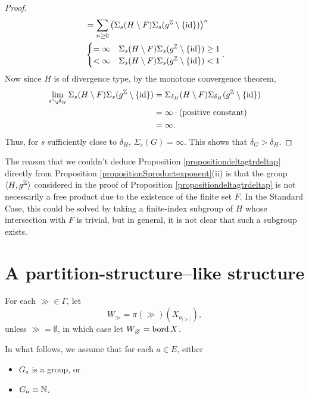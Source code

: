 \begin{proof}
\begin{align*}
&= \sum_{n\geq 0} \left(\Sigma_s(H\butnot F) \Sigma_s(g^\Z\butnot\{\id\})\right)^n\\
&\begin{cases}
= \infty & \Sigma_s(H\butnot F) \Sigma_s(g^\Z\butnot\{\id\}) \geq 1\\
< \infty & \Sigma_s(H\butnot F) \Sigma_s(g^\Z\butnot\{\id\}) < 1
\end{cases}.
\end{align*}
Now since $H$ is of divergence type, by the monotone convergence theorem,
\begin{align*}
\lim_{s\searrow\delta_H} \Sigma_s(H\butnot F) \Sigma_s(g^\Z\butnot\{\id\}) &= \Sigma_{\delta_H}(H\butnot F) \Sigma_{\delta_H}(g^\Z\butnot\{\id\})\\ 
&= \infty \cdot (\text{positive constant})\\
&= \infty.
\end{align*}
Thus, for $s$ sufficiently close to $\delta_H$, $\Sigma_s(G) = \infty$. This shows that $\delta_G > \delta_H$.
\end{proof}
\begin{remark}
The reason that we couldn't deduce Proposition \ref{propositiondeltagtrdeltap} directly from Proposition \ref{propositionSproductexponent}(ii) is that the group $\lb H,g^\Z\rb$ considered in the proof of Proposition \ref{propositiondeltagtrdeltap} is not necessarily a free product due to the existence of the finite set $F$. In the Standard Case, this could be solved by taking a finite-index subgroup of $H$ whose intersection with $F$ is trivial, but in general, it is not clear that such a subgroup exists.
\end{remark}



\section{A partition-structure--like structure}
\label{subsectionWg}
For each $\gg \in\Gamma$, let
\[
W_\gg = \pi(\gg)(X_{a_{|\gg|}}),
\]
unless $\gg = \emptyset$, in which case let $W_\smallemptyset = \bord X$.

\begin{standingassumption}
\label{assumptionGa}
In what follows, we assume that for each $a\in E$, either
\begin{itemize}
\item[(1)] $G_a$ is a group, or
\item[(2)] $G_a\equiv\N$.
\end{itemize}
\end{standingassumption}

